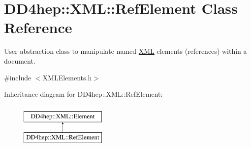 \hypertarget{class_d_d4hep_1_1_x_m_l_1_1_ref_element}{}\section{D\+D4hep\+:\+:X\+ML\+:\+:Ref\+Element Class Reference}
\label{class_d_d4hep_1_1_x_m_l_1_1_ref_element}


User abstraction class to manipulate named \hyperlink{namespace_d_d4hep_1_1_x_m_l}{X\+ML} elements (references) within a document.  




{\ttfamily \#include $<$X\+M\+L\+Elements.\+h$>$}

Inheritance diagram for D\+D4hep\+:\+:X\+ML\+:\+:Ref\+Element\+:\begin{figure}[H]
\begin{center}
\leavevmode
\includegraphics[height=2.000000cm]{class_d_d4hep_1_1_x_m_l_1_1_ref_element}
\end{center}
\end{figure}
